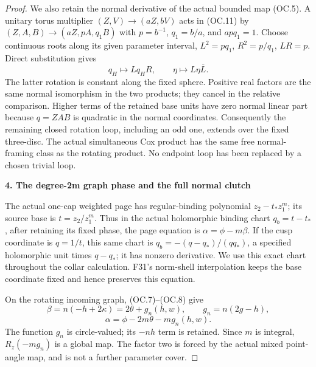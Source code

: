 \begin{proof}
We also retain the normal derivative of the actual bounded map (OC.5).
A unitary torus multiplier \((Z,V)\longrightarrow (aZ,bV)\) acts in (OC.11) by
\((Z,A,B)\longrightarrow (aZ,pA,q_1B)\) with \(p=b^{-1}\), \(q_1=b/a\), and \(a p q_1=1\).
Choose continuous roots along its given parameter interval,
\(L^2=p q_1\), \(R^2=p/q_1\), \(LR=p\). Direct substitution gives
\[
 q_H\longmapsto L q_H R,\qquad
 \eta\longmapsto L\eta\overline L.
 \tag{OC.15}
\]
The latter rotation is constant along the fixed sphere. Positive real
factors are the same normal isomorphism in the two products; they
cancel in the relative comparison. Higher terms of the retained base
units have zero normal linear part because \(q=ZAB\) is quadratic in
the normal coordinates. Consequently the remaining closed rotation
loop, including an odd one, extends over the fixed three-disc. The
actual simultaneous Cox product has the same free normal-framing
class as the rotating product. No endpoint loop has been replaced by
a chosen trivial loop.

\par

\medskip\noindent\textbf{4. The degree-2m graph phase and the full normal clutch}

\par\nobreak

The actual one-cap weighted page has regular-binding polynomial
\(z_2-t_* z_1^m\); its source base is \(t=z_2/z_1^m\).
Thus in the actual holomorphic binding chart \(q_b=t-t_*\), after
retaining its fixed phase, the page equation is
\(\alpha=\phi-m \beta\). If the cusp coordinate is \(q=1/t\), this same
chart is \(q_b=-(q-q_*)/(q q_*)\), a specified holomorphic unit times
\(q-q_*\); it has nonzero derivative. We use this exact chart throughout
the collar calculation. F31's norm-shell interpolation keeps the base
coordinate fixed and hence preserves this equation.

On the rotating incoming graph, (OC.7)--(OC.8) give
\[
 \beta=n(-h+2\kappa)=2\theta+g_n(h,w),\qquad
 g_n=n(2g-h),
\]
\[
 \alpha=\phi-2m\theta-m g_n(h,w).
 \tag{OC.16}
\]
The function \(g_n\) is circle-valued; its \(-n h\) term is retained.
Since \(m\) is integral, \(R_z(-m g_n)\) is a global map. The factor two
is forced by the actual mixed point-angle map, and is not a further
parameter cover.


\end{proof}
